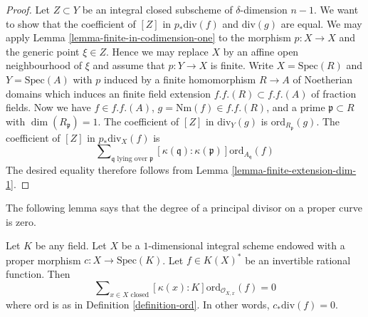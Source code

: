 \begin{proof}
Let $Z \subset Y$ be an integral closed subscheme of $\delta$-dimension
$n - 1$. We want to show that the coefficient of $[Z]$ in
$p_*\text{div}(f)$ and $\text{div}(g)$ are equal. We may apply
Lemma \ref{lemma-finite-in-codimension-one}
to the morphism $p : X \to X$ and the generic point $\xi \in Z$.
Hence we may replace $X$ by an
affine open neighbourhood of $\xi$ and assume that $p : Y \to X$ is finite.
Write $X = \text{Spec}(R)$ and $Y = \text{Spec}(A)$ with $p$ induced
by a finite homomorphism $R \to A$ of Noetherian domains which induces
an finite field extension $f.f.(R) \subset f.f.(A)$ of fraction fields.
Now we have $f \in f.f.(A)$, $g = \text{Nm}(f) \in f.f.(R)$,
and a prime $\mathfrak p \subset R$ with $\dim(R_{\mathfrak p}) = 1$.
The coefficient of $[Z]$ in $\text{div}_Y(g)$ is
$\text{ord}_{R_\mathfrak p}(g)$.
The coefficient of $[Z]$ in $p_*\text{div}_X(f)$ is
$$
\sum\nolimits_{\mathfrak q\text{ lying over }\mathfrak p}
[\kappa(\mathfrak q) : \kappa(\mathfrak p)]
\text{ord}_{A_{\mathfrak q}}(f)
$$
The desired equality therefore follows from
Lemma \ref{lemma-finite-extension-dim-1}.
\end{proof}

\noindent
The following lemma says that the degree of a principal divisor on
a proper curve is zero.

\begin{lemma}
\label{lemma-curve-principal-divisor}
Let $K$ be any field. Let $X$ be a $1$-dimensional integral scheme
endowed with a proper morphism $c : X \to \text{Spec}(K)$.
Let $f \in K(X)^*$ be an invertible rational function.
Then
$$
\sum\nolimits_{x \in X \text{ closed}}
[\kappa(x) : K] \text{ord}_{\mathcal{O}_{X, x}}(f)
=
0
$$
where $\text{ord}$ is as in Definition \ref{definition-ord}.
In other words, $c_*\text{div}(f) = 0$.
\end{lemma}

